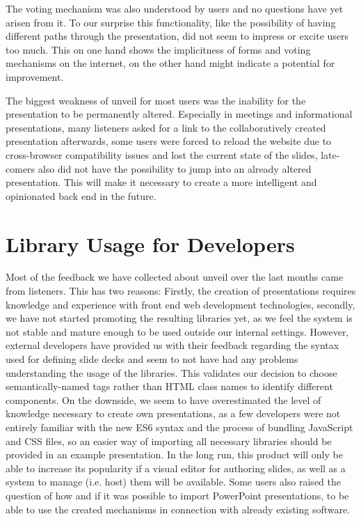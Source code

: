 The voting mechanism was also understood by users and no questions have yet arisen from it. To our surprise this functionality, like the possibility of having different paths through the presentation, did not seem to impress or excite users too much. This on one hand shows the implicitness of forms and voting mechanisms on the internet, on the other hand might indicate a potential for improvement.

The biggest weakness of unveil for most users was the inability for the presentation to be permanently altered. Especially in meetings and informational presentations, many listeners asked for a link to the collaboratively created presentation afterwards, some users were forced to reload the website due to cross-browser compatibility issues and lost the current state of the slides, late-comers also did not have the possibility to jump into an already altered presentation. This will make it necessary to create a more intelligent and opinionated back end in the future.

\section{Library Usage for Developers}
\label{sec:discussion-dev}

Most of the feedback we have collected about unveil over the last months came from listeners. This has two reasons: Firstly, the creation of presentations requires knowledge and experience with front end web development technologies, secondly, we have not started promoting the resulting libraries yet, as we feel the system is not stable and mature enough to be used outside our internal settings. However, external developers have provided us with their feedback regarding the syntax used for defining slide decks and seem to not have had any problems understanding the usage of the libraries. This validates our decision to choose semantically-named tags rather than HTML class names to identify different components. On the downside, we seem to have overestimated the level of knowledge necessary to create own presentations, as a few developers were not entirely familiar with the new ES6 syntax and the process of bundling JavaScript and CSS files, so an easier way of importing all necessary libraries should be provided in an example presentation.
In the long run, this product will only be able to increase its popularity if a visual editor for authoring slides, as well as a system to manage (i.e. host) them will be available. Some users also raised the question of how and if it was possible to import PowerPoint presentations, to be able to use the created mechanisms in connection with already existing software.

